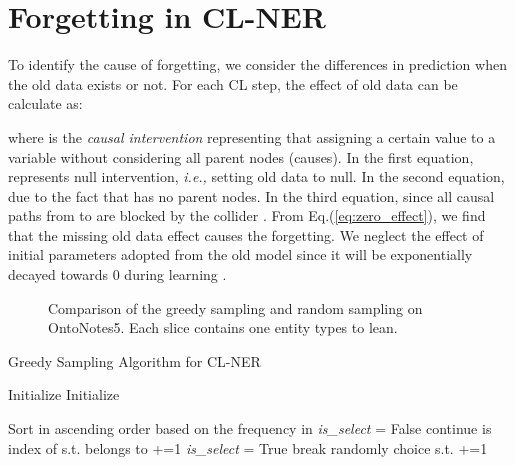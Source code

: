 \documentclass[11pt]{article}
\begin{document}
\section{Forgetting in CL-NER}
\label{appendix:forgetting}
To identify the cause of forgetting, we consider the differences in prediction  when the old data  exists or not.
For each CL step, the effect of old data  can be calculate as:

where  is the \textit{causal intervention} \citep{pearl2014interpretation,pearl2009causality} representing that assigning a certain value to a variable without considering all parent nodes (causes).
In the first equation,  represents null intervention, \textit{i.e.,} setting old data to null.
In the second equation,  due to the fact that  has no parent nodes.
In the third equation,  since all causal paths from  to  are blocked by the collider .
From Eq.(\ref{eq:zero_effect}), we find that the missing old data effect causes the forgetting.
We neglect the effect of initial parameters adopted from the old model since it will be exponentially decayed towards 0 during learning \citep{kirkpatrick2017overcoming}.

\begin{figure*}[t]
    \centering
    \caption{Comparison of the greedy sampling and random sampling on OntoNotes5. Each slice contains one entity types to lean.}
    \label{fig:label_distri}
\end{figure*}


\begin{algorithm}[!t] 
\caption{Greedy Sampling Algorithm for CL-NER} \label{greedy_sampling}
Initialize \;
Initialize \;
{
 
}
Sort  in ascending order based on the frequency in \;
{
    \textit{is\_select} = False\;
    {
        {
            continue\;
        }
         is index of  s.t.  belongs to \;
        \If{}
        {
            \;
             +=1\;
            \textit{is\_select} = True\;
            break\;
        }
    }
    {
        randomly choice  s.t. \;
        \;
         +=1\;
    }
}
\Return \;
\end{algorithm}
\end{document}
